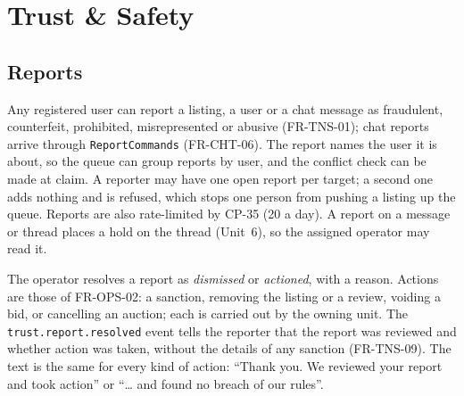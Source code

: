 \documentclass[11pt,a4paper]{article}
\begin{document}
\section{Trust \& Safety}
\label{sec:tns}

\subsection{Reports}
Any registered user can report a listing, a user or a chat message as fraudulent, counterfeit, prohibited, misrepresented or abusive (FR-TNS-01); chat reports arrive through \texttt{ReportCommands} (FR-CHT-06). The report names the user it is about, so the queue can group reports by user, and the conflict check can be made at claim. A reporter may have one open report per target; a second one adds nothing and is refused, which stops one person from pushing a listing up the queue. Reports are also rate-limited by CP-35 (20 a day). A report on a message or thread places a hold on the thread (Unit~6), so the assigned operator may read it.

The operator resolves a report as \emph{dismissed} or \emph{actioned}, with a reason. Actions are those of FR-OPS-02: a sanction, removing the listing or a review, voiding a bid, or cancelling an auction; each is carried out by the owning unit. The \texttt{trust.report.resolved} event tells the reporter that the report was reviewed and whether action was taken, without the details of any sanction (FR-TNS-09). The text is the same for every kind of action: ``Thank you. We reviewed your report and took action'' or ``\dots{} and found no breach of our rules''.
\end{document}
